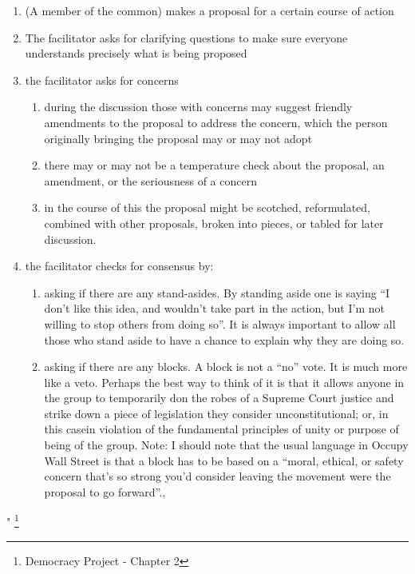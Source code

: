 \documentclass{article}
\begin{document}
\begin{enumerate}[]
	\item (A member of the common) makes a proposal for a certain course of action
	\item The facilitator asks for clarifying questions to make sure everyone understands precisely what is being proposed
	\item the facilitator asks for concerns
	\begin{enumerate}
		\item during the discussion those with concerns may suggest friendly amendments to the proposal to address the concern, which the person originally bringing the proposal may or may not adopt
		\item there may or may not be a temperature check about the proposal, an amendment, or the seriousness of a concern
		\item in the course of this the proposal might be scotched, reformulated, combined with other proposals, broken into pieces, or tabled for later discussion.
	\end{enumerate}
	\item the facilitator checks for consensus by:
	\begin{enumerate}
		\item asking if there are any stand-asides. By standing aside one is saying “I don’t like this idea, and wouldn’t take part in the action, but I’m not willing to stop others from doing so”. It is always important to allow all those who stand aside to have a chance to explain why they are doing so.

		\item asking if there are any blocks. A block is not a “no” vote. It is much more like a veto. Perhaps the best way to think of it is that it allows anyone in the group to temporarily don the robes of a Supreme Court justice and strike down a piece of legislation they consider unconstitutional; or, in this casein violation of the fundamental principles of unity or purpose of being of the group. Note: I should note that the usual language in Occupy Wall Street is that a block has to be based on a “moral, ethical, or safety concern that’s so strong you’d consider leaving the movement were the proposal to go forward”.,

	\end{enumerate}
\end{enumerate}
" \footnote{Democracy Project - Chapter 2 }
\pagebreak
\end{document}
